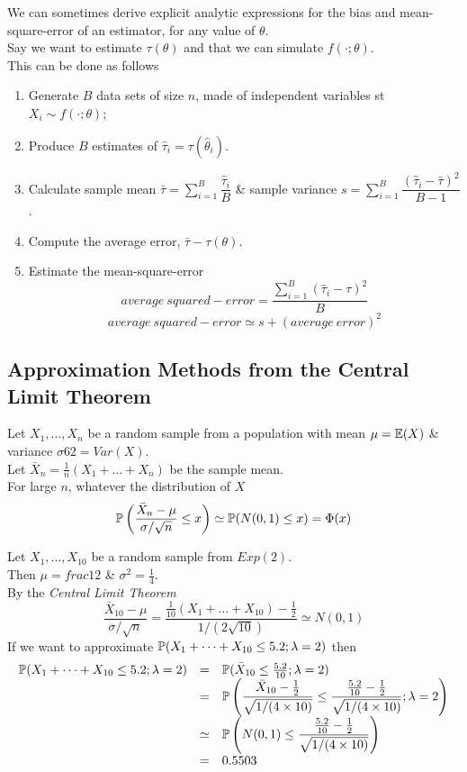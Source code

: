 \documentclass[11pt,a4paper]{article}
\begin{document}
We can sometimes derive explicit analytic expressions for the bias and mean-square-error of an estimator, for any value of $\theta$.\\
Say we want to estimate $\tau(\theta)$ and that we can simulate $f(\cdot;\theta)$.\\
This can be done as follows
\begin{enumerate}
	\item Generate $B$ data sets of size $n$, made of independent variables st $X_i\sim f(\cdot;\theta)$;
	\item Produce $B$ estimates of $\hat{\tau}_i=\tau(\hat{\theta}_i)$.
	\item Calculate sample mean $\bar{\tau}=\sum\limits_{i=1}^B\dfrac{\hat{\tau}_i}{B}$ \& sample variance $s=\sum\limits_{i=1}^B\dfrac{(\hat{\tau}_i-\bar{\tau})^2}{B-1}$.
	\item Compute the average error, $\bar{\tau}-\tau(\theta)$.
	\item Estimate the mean-square-error
	$$average\ squared-error=\dfrac{\sum_{i=1}^B(\hat{\tau}_i-\tau)^2}{B}$$
	$$average\ squared-error\simeq s+(average\ error)^2$$
\end{enumerate}

\subsection{Approximation Methods from the Central Limit Theorem}

Let $X_1,\dots,X_n$ be a random sample from a population with mean $\mu=\mathbb{E}(X)$ \& variance $\sigma62=Var(X)$.\\
Let $\bar{X}_n=\frac{1}{n}(X_1+\dots+X_n)$ be the sample mean.\\
For large $n$, whatever the distribution of $X$
$$\mathbb{P}\left(\frac{\bar{X}_n-\mu}{\sigma/\sqrt{n}}\leq x\right)\simeq\mathbb{P}(N(0,1)\leq x)=\Phi(x)$$

Let $X_1,\dots,X_{10}$ be a random sample from $Exp(2)$.\\
Then $\mu=frac{1}{2}$ \& $\sigma^2=\frac{1}{4}$.\\
By the \textit{Central Limit Theorem}
$$\frac{\bar{X}_{10}-\mu}{\sigma/\sqrt{n}}=\frac{\frac{1}{10}(X_1+\dots+X_{10})-\frac{1}{2}}{1/(2\sqrt{10})}\simeq N(0,1)$$
If we want to approximate $\mathbb{P}(X_1+\dots+X_{10}\leq5.2;\lambda=2)$ then
\[\begin{array}{rcl}
\mathbb{P}(X_1+\dots+X_{10}\leq5.2;\lambda=2)&=&\mathbb{P}(\bar{X}_{10}\leq\frac{5.2}{10};\lambda=2)\\
&=&\mathbb{P}\left(\dfrac{\bar{X}_{10}-\frac{1}{2}}{\sqrt{1/(4\times10)}}\leq\dfrac{\frac{5.2}{10}-\frac{1}{2}}{\sqrt{1/(4\times10)}};\lambda=2\right)\\
&\simeq&\mathbb{P}\left(N(0,1)\leq\dfrac{\frac{5.2}{10}-\frac{1}{2}}{\sqrt{1/(4\times10)}}\right)\\
&=&0.5503
\end{array}\]
\end{document}
